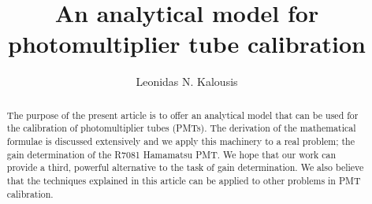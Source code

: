 \documentclass[preprint,12pt]{elsarticle}
\begin{document}
\begin{frontmatter}



\title{An analytical model for photomultiplier tube calibration}


\author{Leonidas N. Kalousis}


\begin{abstract}

The purpose of the present article is to offer an analytical model that can be used for the calibration of photomultiplier tubes (PMTs). 
The derivation of the mathematical formulae is discussed extensively and we apply this machinery to a real problem; the gain determination of the R7081 Hamamatsu PMT. 
 We hope that our work can provide a third, powerful alternative to the task of gain determination. 
 We also believe that the techniques explained in this article can be applied to other problems in PMT calibration. %
 

\end{abstract}
\end{frontmatter}
\end{document}
